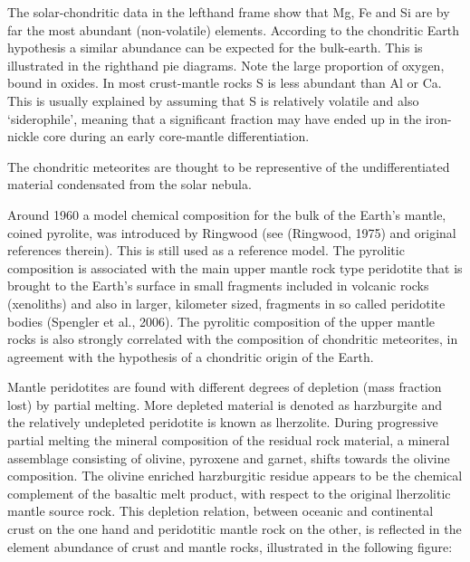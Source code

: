 The solar-chondritic data in the lefthand frame show that Mg, Fe and Si are 
by far the most abundant (non-volatile) elements.
According to the chondritic Earth hypothesis a similar abundance can be expected
for the bulk-earth.
This is illustrated in the righthand pie diagrams.
Note the large proportion of oxygen, bound in oxides.
In most crust-mantle rocks S is less abundant than Al or Ca.
This is usually explained by assuming that S is relatively volatile and 
also `siderophile', meaning that a significant fraction may have ended up in the
iron-nickle core during an early core-mantle differentiation.

The chondritic meteorites are thought to be representive
of the undifferentiated material condensated from the solar nebula.

Around 1960 a model chemical composition for the bulk of the Earth's
mantle, coined pyrolite,
was introduced by Ringwood (see (Ringwood, 1975) and original references
therein).
This is still used as a reference model.
The pyrolitic composition is associated with the main upper mantle rock type
peridotite that is brought to the Earth's surface in small fragments
included in volcanic rocks (xenoliths) and also in larger,
kilometer sized, fragments in so called peridotite bodies
(Spengler et al., 2006).
The pyrolitic composition of the upper mantle rocks is also strongly
correlated with the composition of chondritic meteorites,
in agreement with the hypothesis of a chondritic origin of the Earth.

Mantle peridotites are found with different degrees of depletion 
(mass fraction lost) by partial melting.
More depleted material is denoted as harzburgite and the relatively 
undepleted peridotite is known as lherzolite.
During progressive partial melting the mineral composition of the residual
rock material, a mineral assemblage consisting of olivine, pyroxene and
garnet, shifts towards the olivine composition.
The olivine enriched harzburgitic residue appears to be the chemical
complement of the basaltic melt product, with respect to the original
lherzolitic mantle source rock.
This depletion relation, between oceanic and continental crust on the one
hand and peridotitic mantle rock on the other,
is reflected in the element abundance of crust and mantle rocks, 
illustrated in the following figure:

